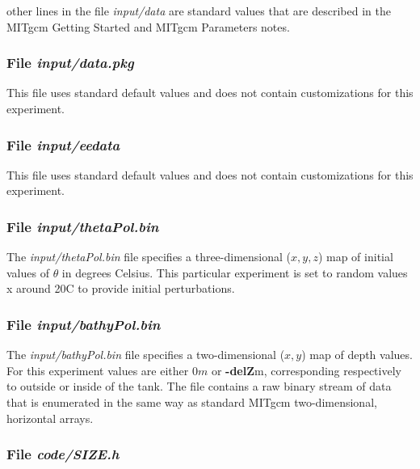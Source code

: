 \noindent other lines in the file {\it input/data} are standard values
that are described in the MITgcm Getting Started and MITgcm Parameters
notes.

\begin{small}

\end{small}

\subsubsection{File {\it input/data.pkg}}
\label{www:tutorials}

This file uses standard default values and does not contain
customizations for this experiment.

\subsubsection{File {\it input/eedata}}
\label{www:tutorials}

This file uses standard default values and does not contain
customizations for this experiment.

\subsubsection{File {\it input/thetaPol.bin}}
\label{www:tutorials}

The {\it input/thetaPol.bin} file specifies a three-dimensional ($x,y,z$) 
map of initial values of $\theta$ in degrees Celsius.  This particular 
experiment is set to random values x around 20C to provide initial 
perturbations.

\subsubsection{File {\it input/bathyPol.bin}}
\label{www:tutorials}


The {\it input/bathyPol.bin} file specifies a two-dimensional ($x,y$) 
map of depth values. For this experiment values are either
$0m$ or {\bf -delZ}m, corresponding respectively to outside or inside of
the tank. The file contains a raw binary stream of data that is enumerated
in the same way as standard MITgcm two-dimensional, horizontal arrays.

\subsubsection{File {\it code/SIZE.h}}
\label{www:tutorials}

